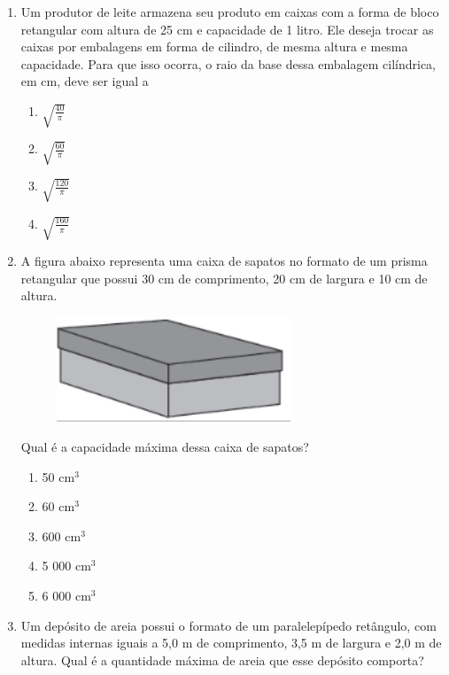 \documentclass[twocolumn,oneside,a4paper,12.0pt]{article}
\begin{document}
\begin{enumerate}
\item Um produtor de leite armazena seu produto em caixas com a forma de bloco retangular com altura de 25 cm e capacidade de 1 litro. Ele deseja trocar as caixas por embalagens em forma de cilindro, de mesma altura e mesma capacidade. Para que isso ocorra, o raio da base dessa embalagem cilíndrica, em cm, deve ser igual a

	\begin{enumerate}
	\item $ \sqrt{\frac{40}{\pi}} $
	\item $ \sqrt{\frac{60}{\pi}} $
	\item $ \sqrt{\frac{120}{\pi}} $
	\item $ \sqrt{\frac{160}{\pi}} $	
	\end{enumerate}

\item  A figura abaixo representa uma caixa de sapatos no formato de um prisma retangular que possui 30 cm de comprimento, 20 cm de largura e 10 cm de altura.

	\begin{figure}[!htb]
	\center
	\includegraphics[width=7cm]{Extras/v2.png}
	\end{figure}

Qual é a capacidade máxima dessa caixa de sapatos? 

	\begin{enumerate}
	\item 50 cm$^3$
	\item 60 cm$^3$
	\item 600 cm$^3$
	\item 5 000 cm$^3$
	\item 6 000 cm$^3$
	\end{enumerate}


\item Um depósito de areia possui o formato de um paralelepípedo retângulo, com medidas internas iguais a 5,0 m de comprimento, 3,5 m de largura e 2,0 m de altura. Qual é a quantidade máxima de areia que esse depósito comporta?


\end{enumerate}
\end{document}
